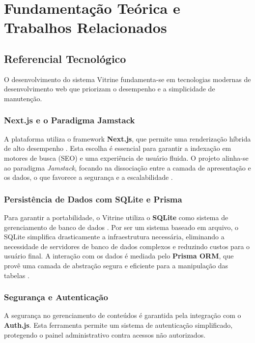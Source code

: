 \chapter{Fundamentação Teórica e Trabalhos Relacionados}\label{cap:refTeorico}

\section{Referencial Tecnológico}

O desenvolvimento do sistema Vitrine fundamenta-se em tecnologias modernas de desenvolvimento web que priorizam o desempenho e a simplicidade de manutenção. 

\subsection{Next.js e o Paradigma Jamstack}
A plataforma utiliza o framework \textbf{Next.js}, que permite uma renderização híbrida de alto desempenho \cite{nextjs_docs}. Esta escolha é essencial para garantir a indexação em motores de busca (SEO) e uma experiência de usuário fluida. O projeto alinha-se ao paradigma \textit{Jamstack}, focando na dissociação entre a camada de apresentação e os dados, o que favorece a segurança e a escalabilidade \cite{ref7}.

\subsection{Persistência de Dados com SQLite e Prisma}
Para garantir a portabilidade, o Vitrine utiliza o \textbf{SQLite} como sistema de gerenciamento de banco de dados \cite{prisma_docs}. Por ser um sistema baseado em arquivo, o SQLite simplifica drasticamente a infraestrutura necessária, eliminando a necessidade de servidores de banco de dados complexos e reduzindo custos para o usuário final. A interação com os dados é mediada pelo \textbf{Prisma ORM}, que provê uma camada de abstração segura e eficiente para a manipulação das tabelas \cite{prisma_docs}.

\subsection{Segurança e Autenticação}
A segurança no gerenciamento de conteúdos é garantida pela integração com o \textbf{Auth.js}. Esta ferramenta permite um sistema de autenticação simplificado, protegendo o painel administrativo contra acessos não autorizados.

